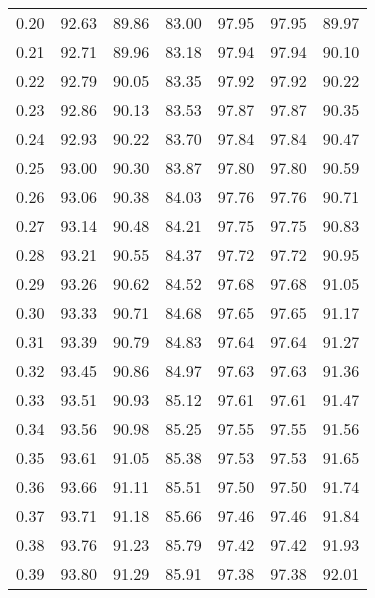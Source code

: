 \begin{tabular}{|c|c|c|c|c|c|c|}
      0.20 &     92.63 &     89.86 &      83.00 &   97.95 &      97.95 &         89.97 \\
      0.21 &     92.71 &     89.96 &      83.18 &   97.94 &      97.94 &         90.10 \\
      0.22 &     92.79 &     90.05 &      83.35 &   97.92 &      97.92 &         90.22 \\
      0.23 &     92.86 &     90.13 &      83.53 &   97.87 &      97.87 &         90.35 \\
      0.24 &     92.93 &     90.22 &      83.70 &   97.84 &      97.84 &         90.47 \\
      0.25 &     93.00 &     90.30 &      83.87 &   97.80 &      97.80 &         90.59 \\
      0.26 &     93.06 &     90.38 &      84.03 &   97.76 &      97.76 &         90.71 \\
      0.27 &     93.14 &     90.48 &      84.21 &   97.75 &      97.75 &         90.83 \\
      0.28 &     93.21 &     90.55 &      84.37 &   97.72 &      97.72 &         90.95 \\
      0.29 &     93.26 &     90.62 &      84.52 &   97.68 &      97.68 &         91.05 \\
      0.30 &     93.33 &     90.71 &      84.68 &   97.65 &      97.65 &         91.17 \\
      0.31 &     93.39 &     90.79 &      84.83 &   97.64 &      97.64 &         91.27 \\
      0.32 &     93.45 &     90.86 &      84.97 &   97.63 &      97.63 &         91.36 \\
      0.33 &     93.51 &     90.93 &      85.12 &   97.61 &      97.61 &         91.47 \\
      0.34 &     93.56 &     90.98 &      85.25 &   97.55 &      97.55 &         91.56 \\
      0.35 &     93.61 &     91.05 &      85.38 &   97.53 &      97.53 &         91.65 \\
      0.36 &     93.66 &     91.11 &      85.51 &   97.50 &      97.50 &         91.74 \\
      0.37 &     93.71 &     91.18 &      85.66 &   97.46 &      97.46 &         91.84 \\
      0.38 &     93.76 &     91.23 &      85.79 &   97.42 &      97.42 &         91.93 \\
      0.39 &     93.80 &     91.29 &      85.91 &   97.38 &      97.38 &         92.01 \\

\end{tabular}
